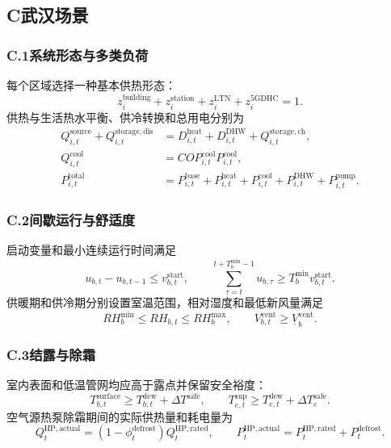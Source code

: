 \subsection*{C\quad 武汉场景}

\subsubsection*{C.1\quad 系统形态与多类负荷}

每个区域选择一种基本供热形态：
\begin{equation}
z_i^{\mathrm{building}}+z_i^{\mathrm{station}}+z_i^{\mathrm{LTN}}+z_i^{\mathrm{5GDHC}}=1.
\end{equation}
供热与生活热水平衡、供冷转换和总用电分别为
\begin{align}
Q_{i,t}^{\mathrm{source}}+Q_{i,t}^{\mathrm{storage,dis}}
&=D_{i,t}^{\mathrm{heat}}+D_{i,t}^{\mathrm{DHW}}+Q_{i,t}^{\mathrm{storage,ch}},\\
Q_{i,t}^{\mathrm{cool}}&=COP_{i,t}^{\mathrm{cool}}P_{i,t}^{\mathrm{cool}},\\
P_{i,t}^{\mathrm{total}}&=P_{i,t}^{\mathrm{base}}+P_{i,t}^{\mathrm{heat}}
+P_{i,t}^{\mathrm{cool}}+P_{i,t}^{\mathrm{DHW}}+P_{i,t}^{\mathrm{pump}}.
\end{align}

\subsubsection*{C.2\quad 间歇运行与舒适度}

启动变量和最小连续运行时间满足
\begin{equation}
u_{b,t}-u_{b,t-1}\leq v_{b,t}^{\mathrm{start}},\qquad
\sum_{\tau=t}^{t+T_b^{\min}-1}u_{b,\tau}\geq T_b^{\min}v_{b,t}^{\mathrm{start}}.
\end{equation}
供暖期和供冷期分别设置室温范围，相对湿度和最低新风量满足
\begin{equation}
RH_b^{\min}\leq RH_{b,t}\leq RH_b^{\max},\qquad
V_{b,t}^{\mathrm{vent}}\geq\underline V_b^{\mathrm{vent}}.
\end{equation}

\subsubsection*{C.3\quad 结露与除霜}

室内表面和低温管网均应高于露点并保留安全裕度：
\begin{equation}
T_{b,t}^{\mathrm{surface}}\geq T_{b,t}^{\mathrm{dew}}+\Delta T^{\mathrm{safe}},
\qquad T_{e,t}^{\mathrm{sup}}\geq T_{e,t}^{\mathrm{dew}}+\Delta T_e^{\mathrm{safe}}.
\end{equation}
空气源热泵除霜期间的实际供热量和耗电量为
\begin{equation}
Q_t^{\mathrm{HP,actual}}=(1-\phi_t^{\mathrm{defrost}})Q_t^{\mathrm{HP,rated}},
\qquad P_t^{\mathrm{HP,actual}}=P_t^{\mathrm{HP,rated}}+P_t^{\mathrm{defrost}}.
\end{equation}

